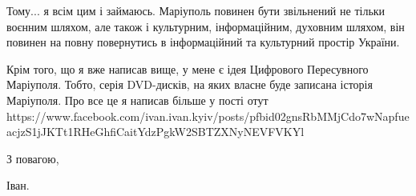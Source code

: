 Тому... я всім цим і займаюсь. Маріуполь повинен бути звільнений не тільки
воєнним шляхом, але також і культурним, інформаційним, духовним шляхом, він
повинен на повну повернутись в інформаційний та культурний простір України. 

Крім того, що я вже написав вище, у мене є ідея Цифрового Пересувного Маріуполя. Тобто,
серія DVD-дисків, на яких власне буде записана історія Маріуполя. Про все це я написав 
більше у пості отут 
https://www.facebook.com/ivan.ivan.kyiv/posts/pfbid02gnsRbMMjCdo7wNapfueacjzS1jJKTt1RHeGhfiCaitYdzPgkW2SBTZXNyNEVFVKYl

З повагою,

Іван.

